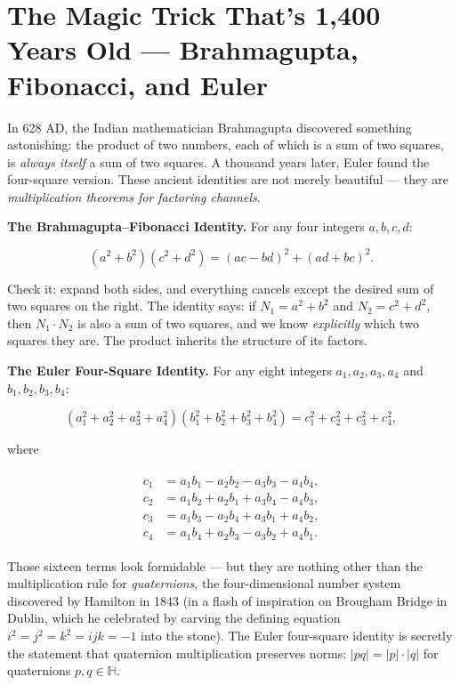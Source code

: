 \documentclass[11pt,twoside,openright]{book}
\theoremstyle{definition}
\theoremstyle{remark}
\begin{document}
\section{The Magic Trick That's 1,400 Years Old --- Brahmagupta, Fibonacci, and Euler}

In 628 AD, the Indian mathematician Brahmagupta discovered something astonishing: the product of two numbers, each of which is a sum of two squares, is \textit{always itself} a sum of two squares. A thousand years later, Euler found the four-square version. These ancient identities are not merely beautiful --- they are \textit{multiplication theorems for factoring channels}.

\textbf{The Brahmagupta--Fibonacci Identity.} For any four integers $a, b, c, d$:

\[(a^2 + b^2)(c^2 + d^2) = (ac - bd)^2 + (ad + bc)^2.\]

Check it: expand both sides, and everything cancels except the desired sum of two squares on the right. The identity says: if $N_1 = a^2 + b^2$ and $N_2 = c^2 + d^2$, then $N_1 \cdot N_2$ is also a sum of two squares, and we know \textit{explicitly} which two squares they are. The product inherits the structure of its factors.

\textbf{The Euler Four-Square Identity.} For any eight integers $a_1, a_2, a_3, a_4$ and $b_1, b_2, b_3, b_4$:

\[(a_1^2 + a_2^2 + a_3^2 + a_4^2)(b_1^2 + b_2^2 + b_3^2 + b_4^2) = c_1^2 + c_2^2 + c_3^2 + c_4^2,\]

where

\begin{align*}
\begin{aligned}
c_1 &= a_1 b_1 - a_2 b_2 - a_3 b_3 - a_4 b_4, \\
c_2 &= a_1 b_2 + a_2 b_1 + a_3 b_4 - a_4 b_3, \\
c_3 &= a_1 b_3 - a_2 b_4 + a_3 b_1 + a_4 b_2, \\
c_4 &= a_1 b_4 + a_2 b_3 - a_3 b_2 + a_4 b_1.
\end{aligned}
\end{align*}

Those sixteen terms look formidable --- but they are nothing other than the multiplication rule for \textit{quaternions}, the four-dimensional number system discovered by Hamilton in 1843 (in a flash of inspiration on Brougham Bridge in Dublin, which he celebrated by carving the defining equation $i^2 = j^2 = k^2 = ijk = -1$ into the stone). The Euler four-square identity is secretly the statement that quaternion multiplication preserves norms: $|pq| = |p| \cdot |q|$ for quaternions $p, q \in \mathbb{H}$.
\end{document}
